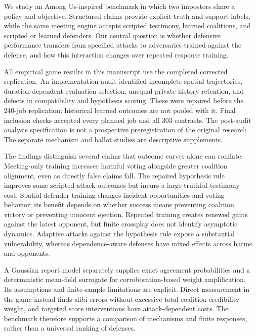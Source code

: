 \documentclass[
  12pt,
]{article}
\begin{document}
We study an Among Us-inspired benchmark in which two impostors share a
policy and objective. Structured claims provide explicit truth and
support labels, while the same meeting engine accepts scripted
testimony, learned coalitions, and scripted or learned defenders. Our
central question is whether defensive performance transfers from
specified attacks to adversaries trained against the defense, and how
this interaction changes over repeated response training.

All empirical game results in this manuscript use the completed
corrected replication. An implementation audit identified incomplete
spatial trajectories, duration-dependent evaluation selection, unequal
private-history retention, and defects in compatibility and hypothesis
scoring. These were repaired before the 240-job replication; historical
learned outcomes are not pooled with it. Final inclusion checks accepted
every planned job and all 303 contrasts. The post-audit analysis
specification is not a prospective preregistration of the original
research. The separate mechanism and ballot studies are descriptive
supplements.

The findings distinguish several claims that outcome curves alone can
conflate. Meeting-only training increases harmful voting alongside
greater coalition alignment, even as directly false claims fall. The
repaired hypothesis rule improves some scripted-attack outcomes but
incurs a large truthful-testimony cost. Spatial defender training
changes incident opportunities and voting behavior; its benefit depends
on whether success means preventing coalition victory or preventing
innocent ejection. Repeated training creates renewed gains against the
latest opponent, but finite crossplay does not identify asymptotic
dynamics. Adaptive attacks against the hypothesis rule expose a
substantial vulnerability, whereas dependence-aware defenses have mixed
effects across harms and opponents.

A Gaussian report model separately supplies exact agreement
probabilities and a deterministic mean-field surrogate for
corroboration-based weight amplification. Its assumptions and
finite-sample limitations are explicit. Direct measurement in the game
instead finds alibi errors without excessive total coalition credibility
weight, and targeted score interventions have attack-dependent costs.
The benchmark therefore supports a comparison of mechanisms and finite
responses, rather than a universal ranking of defenses.

\FloatBarrier
\end{document}
